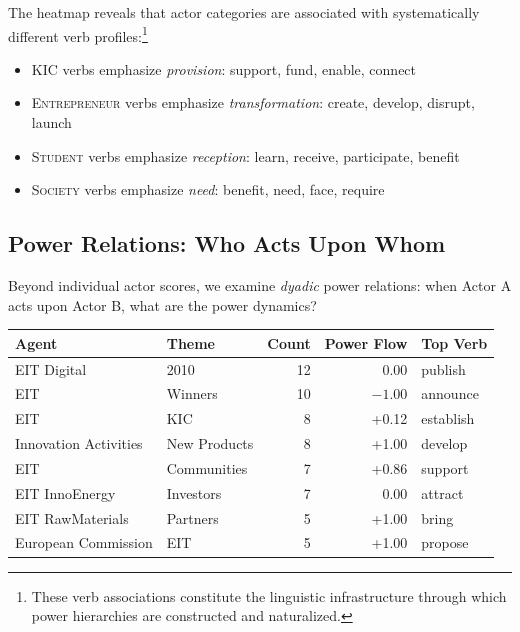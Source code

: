 \documentclass[../main.tex]{subfiles}
\begin{document}
The heatmap reveals that actor categories are associated with systematically different verb profiles:\footnote{These verb associations constitute the linguistic infrastructure through which power hierarchies are constructed and naturalized.}

\begin{itemize}
    \item \textsc{KIC} verbs emphasize \textit{provision}: support, fund, enable, connect
    \item \textsc{Entrepreneur} verbs emphasize \textit{transformation}: create, develop, disrupt, launch
    \item \textsc{Student} verbs emphasize \textit{reception}: learn, receive, participate, benefit
    \item \textsc{Society} verbs emphasize \textit{need}: benefit, need, face, require
\end{itemize}

\subsection{Power Relations: Who Acts Upon Whom}

Beyond individual actor scores, we examine \textit{dyadic} power relations: when Actor A acts upon Actor B, what are the power dynamics?

\begin{center}
\small
\begin{tabular}{llrrl}
\toprule
\textbf{Agent} & \textbf{Theme} & \textbf{Count} & \textbf{Power Flow} & \textbf{Top Verb} \\
\midrule
EIT Digital & 2010 & 12 & 0.00 & publish \\
EIT & Winners & 10 & $-1.00$ & announce \\
EIT & KIC & 8 & +0.12 & establish \\
Innovation Activities & New Products & 8 & +1.00 & develop \\
EIT & Communities & 7 & +0.86 & support \\
EIT InnoEnergy & Investors & 7 & 0.00 & attract \\
EIT RawMaterials & Partners & 5 & +1.00 & bring \\
European Commission & EIT & 5 & +1.00 & propose \\
\bottomrule
\end{tabular}
\end{center}
\end{document}
